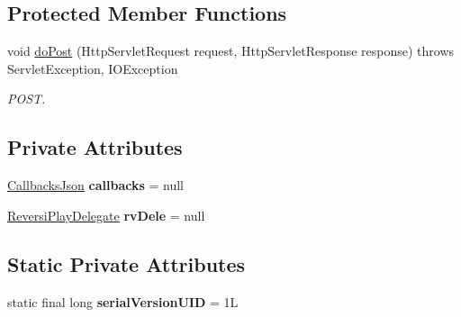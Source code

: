 \subsection*{Protected Member Functions}
\begin{DoxyCompactItemize}
\item 
void \mbox{\hyperlink{classjp_1_1gr_1_1java__conf_1_1yuta__yoshinaga_1_1reversi_1_1controller_1_1_front_controller_a2f0d63da6e6fc17d2ecf2695af6f8d99}{do\+Post}} (Http\+Servlet\+Request request, Http\+Servlet\+Response response)  throws Servlet\+Exception, I\+O\+Exception 
\begin{DoxyCompactList}\small\item\em P\+O\+ST. \end{DoxyCompactList}\end{DoxyCompactItemize}
\subsection*{Private Attributes}
\begin{DoxyCompactItemize}
\item 
\mbox{\label{classjp_1_1gr_1_1java__conf_1_1yuta__yoshinaga_1_1reversi_1_1controller_1_1_front_controller_aba15286819435469622375192358dee7}} 
\mbox{\hyperlink{classjp_1_1gr_1_1java__conf_1_1yuta__yoshinaga_1_1reversi_1_1model_1_1_callbacks_json}{Callbacks\+Json}} {\bfseries callbacks} = null
\item 
\mbox{\label{classjp_1_1gr_1_1java__conf_1_1yuta__yoshinaga_1_1reversi_1_1controller_1_1_front_controller_a582bcd1cbb69aaf686182d85dbd21f2d}} 
\mbox{\hyperlink{classjp_1_1gr_1_1java__conf_1_1yuta__yoshinaga_1_1reversi_1_1model_1_1_reversi_play_delegate}{Reversi\+Play\+Delegate}} {\bfseries rv\+Dele} = null
\end{DoxyCompactItemize}
\subsection*{Static Private Attributes}
\begin{DoxyCompactItemize}
\item 
\mbox{\label{classjp_1_1gr_1_1java__conf_1_1yuta__yoshinaga_1_1reversi_1_1controller_1_1_front_controller_a42e40239dd4f246bd1524cdb08ca41af}} 
static final long {\bfseries serial\+Version\+U\+ID} = 1L
\end{DoxyCompactItemize}


